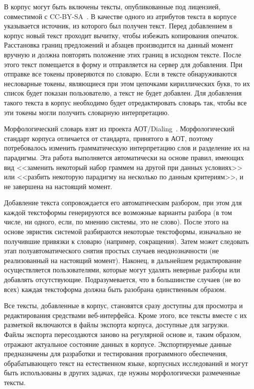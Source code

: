 \documentclass[a4paper]{article}
\begin{document}
В корпус могут быть включены тексты, опубликованные под лицензией, совместимой с CC-BY-SA~\cite{cc-by-sa}. В качестве одного из атрибутов текста в корпусе указывается источник, из которого был получен текст. Перед добавлением в корпус новый текст проходит вычитку, чтобы избежать копирования опечаток. Расстановка границ предложений и абзацев производится на данный момент вручную и должна повторять положение этих границ в исходном тексте. После этого текст помещается в форму и отправляется на сервер для добавления. При отправке все токены проверяются по словарю. Если в тексте обнаруживаются несловарные токены, являющиеся при этом цепочками кириллических букв, то их список будет показан пользователю, а текст не будет добавлен. Для добавления такого текста в корпус необходимо будет отредактировать словарь так, чтобы все эти токены могли получить словарную интерпретацию.

Морфологический словарь взят из проекта АОТ/Dialing~\cite{aot}. Морфологический стандарт корпуса отличается от стандарта, принятого в АОТ, поэтому потребовалось изменить грамматическую интерпретацию слов и разделение их на парадигмы. Эта работа выполняется автоматически на основе правил, имеющих вид <<заменить некоторый набор граммем на другой при данных условиях>> или <<разбить некоторую парадигму на несколько по данным критериям>>, и не завершена на настоящий момент.

Добавление текста сопровождается его автоматическим разбором, при этом для каждой текстоформы генерируются все возможные варианты разбора (в том числе, ни одного, если, по мнению системы, это не слово). После этого на основе эвристик системой разбираются некоторые текстоформы, изначально не получившие привязки к словарю (например, сокращения). Затем может следовать этап полуавтоматического снятия простых случаев неоднозначности (не реализованный на настоящий момент). Наконец, в дальнейшем редактирование осуществляется пользователями, которые могут удалять неверные разборы или добавлять отсутствующие.  Подразумевается, что в большинстве случаев (не во всех) каждая текстоформа должна быть разобрана единственным образом.

Все тексты, добавленные в корпус, становятся сразу доступны для просмотра и редактирования средствами веб-интерфейса. Кроме этого, все тексты вместе с их разметкой включаются в файлы экспорта корпуса, доступные для загрузки. Файлы экспорта пересоздаются заново на регулярной основе и, таким образом, отражают актуальное состояние данных в корпусе. Экспортируемые данные предназначены для разработки и тестирования программного обеспечения, обрабатывающего текст на естественном языке, корпусных исследований и могут быть использованы в других задачах, где нужны морфологически размеченные тексты.
\end{document}
